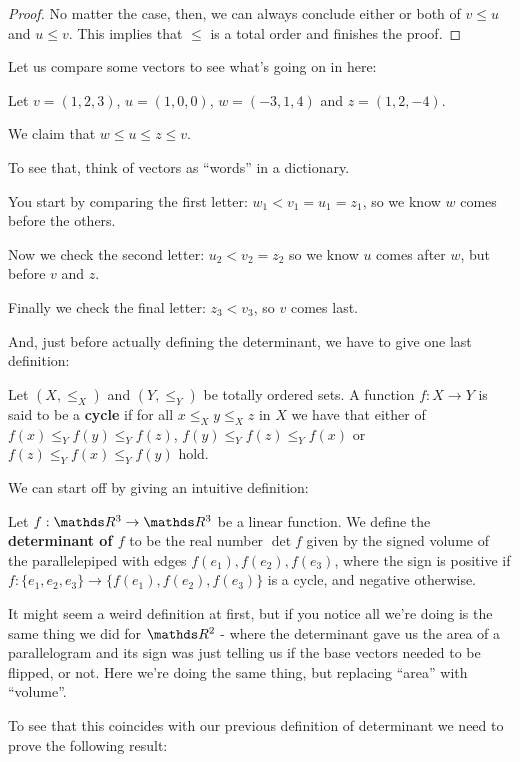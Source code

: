 \begin{proof}
	No matter the case, then, we can always conclude either or both of $v\leq u$ and $u\leq v$. This implies that $\leq$ is a total order and finishes the proof.
\end{proof}

\begin{ex}
	Let us compare some vectors to see what's going on in here:
	
	Let $v=(1,2,3)$, $u=(1,0,0)$, $w=(-3,1,4)$ and $z=(1,2,-4)$.
	
	We claim that $w\leq u\leq z\leq v$.
	
	To see that, think of vectors as ``words'' in a dictionary.
	
	You start by comparing the first letter: $w_1<v_1=u_1=z_1$, so we know $w$ comes before the others.
	
	Now we check the second letter: $u_2<v_2=z_2$ so we know $u$ comes after $w$, but before $v$ and $z$.
	
	Finally we check the final letter: $z_3<v_3$, so $v$ comes last.
\end{ex}

And, just before actually defining the determinant, we have to give one last definition:

\begin{df}
	Let $(X,\leq_X)$ and $(Y,\leq_Y)$ be totally ordered sets. A function $f:X\to Y$ is said to be a \textbf{cycle} if for all $x\leq_X y\leq_X z$ in $X$ we have that either of $f(x)\leq_Y f(y)\leq_Y f(z)$, $f(y)\leq_Y f(z)\leq_Y f(x)$ or $f(z)\leq_Y f(x)\leq_Y f(y)$ hold.
\end{df}

We can start off by giving an intuitive definition:
\begin{df}
	Let $f:\R^3\to\R^3$ be a linear function. We define the \textbf{determinant of $f$} to be the real number $\det f$ given by the signed volume of the parallelepiped with edges $f(e_1),f(e_2),f(e_3)$, where the sign is positive if $f:\{e_1,e_2,e_3\}\to\{f(e_1),f(e_2),f(e_3)\}$ is a cycle, and negative otherwise.
\end{df}

It might seem a weird definition at first, but if you notice all we're doing is the same thing we did for $\R^2$ - where the determinant gave us the area of a parallelogram and its sign was just telling us if the base vectors needed to be flipped, or not. Here we're doing the same thing, but replacing ``area'' with ``volume''.

To see that this coincides with our previous definition of determinant we need to prove the following result:

